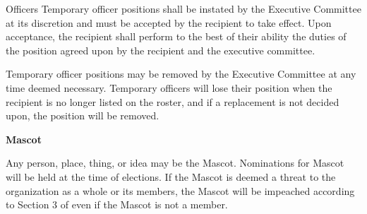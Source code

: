 {\begin{article}{Officers}
		Temporary officer positions shall be instated by the Executive Committee at its discretion and must be accepted by the recipient to take effect.  Upon acceptance, the recipient shall perform to the best of their ability the duties of the position agreed upon by the recipient and the executive committee.
		
		Temporary officer positions may be removed by the Executive Committee at any time deemed necessary.  Temporary officers will lose their position when the recipient is no longer listed on the roster, and if a replacement is not decided upon, the position will be removed.
		\item \textbf{Mascot}
		
		Any person, place, thing, or idea may be the Mascot.  Nominations for Mascot will be held at the time of elections.  If the Mascot is deemed a threat to the organization as a whole or its members, the Mascot will be impeached according to Section 3 of  even if the Mascot is not a member.
	\end{article}
}